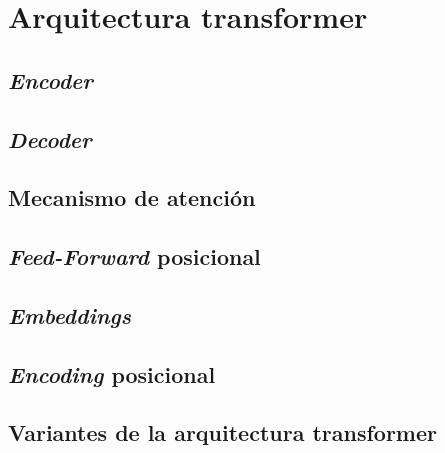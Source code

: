 \section{Arquitectura transformer}
\subsection{\textit{Encoder}}
\subsection{\textit{Decoder}}
\subsection{Mecanismo de atención}
\subsection{\textit{Feed-Forward} posicional}
\subsection{\textit{Embeddings}}
\subsection{\textit{Encoding} posicional}
\subsection{Variantes de la arquitectura transformer} \label{transfvariants}
\cite{Tay2020Sep, Lin2021Jun}
